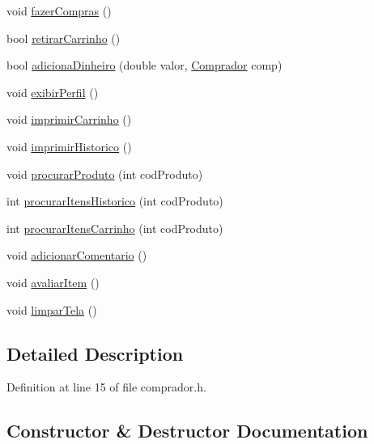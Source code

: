 \begin{DoxyCompactItemize}
\item 
void \hyperlink{class_comprador_a93794d8122ae9f09f192af5d0c027527}{fazer\+Compras} ()
\item 
bool \hyperlink{class_comprador_a8a5fc62485a3a9b37340609715e73feb}{retirar\+Carrinho} ()
\item 
bool \hyperlink{class_comprador_ab996419e954d24ac9c97e646e81b0c9c}{adiciona\+Dinheiro} (double valor, \hyperlink{class_comprador}{Comprador} comp)
\item 
void \hyperlink{class_comprador_a35d18c3bcfff0adfe8dd3b75f46f8bd8}{exibir\+Perfil} ()
\item 
void \hyperlink{class_comprador_a22479e83d85331787d699d74c1307ad2}{imprimir\+Carrinho} ()
\item 
void \hyperlink{class_comprador_a4c67775d6f1e703278569ebf9cc20a79}{imprimir\+Historico} ()
\item 
void \hyperlink{class_comprador_a05415fa7c875440e86d5781f04577572}{procurar\+Produto} (int cod\+Produto)
\item 
int \hyperlink{class_comprador_a0ebab4be27f71b04734794765d661529}{procurar\+Itens\+Historico} (int cod\+Produto)
\item 
int \hyperlink{class_comprador_a5b8bcd0a0576385fd5614be8a3b2160b}{procurar\+Itens\+Carrinho} (int cod\+Produto)
\item 
void \hyperlink{class_comprador_aef06de4d0e7dfaeb5ad5411e895e31b3}{adicionar\+Comentario} ()
\item 
void \hyperlink{class_comprador_a10b29882e2737563350cdf6f157d82b4}{avaliar\+Item} ()
\item 
void \hyperlink{class_comprador_a511093b891d5c4202cee1f25ccbed66e}{limpar\+Tela} ()
\end{DoxyCompactItemize}


\subsection{Detailed Description}


Definition at line 15 of file comprador.\+h.



\subsection{Constructor \& Destructor Documentation}
\mbox{\label{class_comprador_aa8494892432d46b4c8825a5b435af44d}} 
